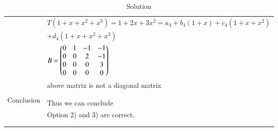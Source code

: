 \begin{longtable}{|l|l|}
&  
$T(1+x+x^2+x^3) = 1+2x+3x^2 = a_4+b_4(1+x)+c_4(1+x+x^2)$\\
&
\qquad\qquad\qquad\qquad+$d_4(1+x+x^2+x^3)$\\
&
\qquad\qquad\qquad $B=\begin{pmatrix}0&1&-1&-1\\0&0&2&-1\\0&0&0&3\\0&0&0&0\end{pmatrix}$\\
&
above matrix is not a diagonal matrix\\
&\\
\hline
\multirow{3}{*}{Conclusion} & \\
&
Thus we can conclude \\
&
Option 2) and 3) are correct.\\
&\\
\hline
\caption{Solution}
\label{eq:solutions/2017/june/71/table2}
\end{longtable}
